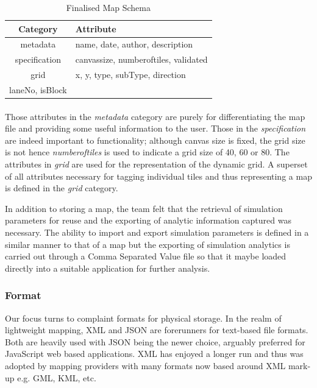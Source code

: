 \begin{table}[h]
\centering
\begin{tabular}{|c|l|}
	\hline
	\textbf{Category} & \textbf{Attribute} \\ \hline
	metadata & name, date, author, description \\ \hline
	specification & canvas\textunderscore size, number\textunderscore of\textunderscore tiles, validated \\ \hline
	grid & x, y, type, subType, direction \\
	laneNo, isBlock \\ \hline
\end{tabular}
\caption{Finalised Map Schema}
\label{ref:mapTable}
\end{table}

\paragraph{}
Those attributes in the \textit{metadata} category are purely for differentiating the map file and providing some useful information to the user. Those in the \textit{specification} are indeed important to functionality; although canvas size is fixed, the grid size is not hence \textit{number\textunderscore of\textunderscore tiles} is used to indicate a grid size of 40, 60 or 80. The attributes in \textit{grid} are used for the representation of the dynamic grid. A superset of all attributes necessary for tagging individual tiles and thus representing a map is defined in the \textit{grid} category.

In addition to storing a map, the team felt that the retrieval of simulation parameters for reuse and the exporting of analytic information captured was necessary. The ability to import and export simulation parameters is defined in a similar manner to that of a map but the exporting of simulation analytics is carried out through a Comma Separated Value file so that it maybe loaded directly into a suitable application for further analysis.

\subsubsection{Format}
Our focus turns to complaint formats for physical storage. In the realm of lightweight mapping, XML and JSON are forerunners for text-based file formats. Both are heavily used with JSON being the newer choice, arguably preferred for JavaScript web based applications. XML has enjoyed a longer run and thus was adopted by mapping providers with many formats now based around XML mark-up e.g. GML, KML, etc.
 
